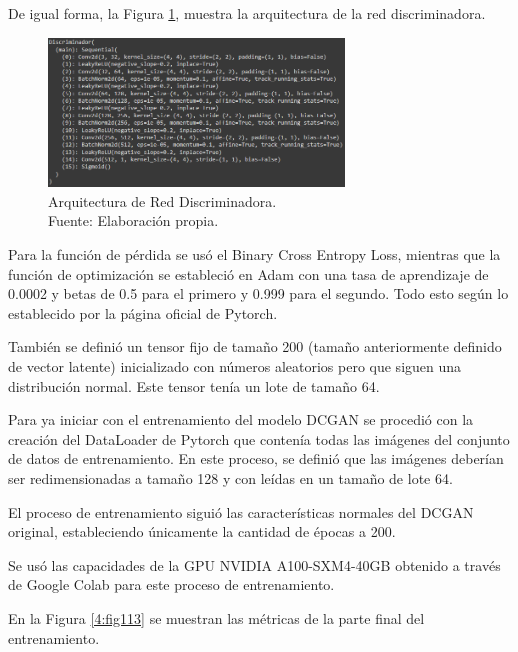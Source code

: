 De igual forma, la Figura \ref{4:fig112}, muestra la arquitectura de la red discriminadora. 

\begin{figure}[H]
	\begin{center}
		\includegraphics[width=0.70\textwidth]{4/figures/discriminator_network.PNG}
		\caption[Arquitectura de Red Discriminadora]{Arquitectura de Red Discriminadora. \\
		Fuente: Elaboración propia.}
		\label{4:fig112}
	\end{center}
\end{figure}

Para la función de pérdida se usó el Binary Cross Entropy Loss, mientras que la función de optimización se estableció en Adam con una tasa de aprendizaje de 0.0002 y betas de 0.5 para el primero y 0.999 para el segundo. Todo esto según lo establecido por la página oficial de Pytorch.

También se definió un tensor fijo de tamaño 200 (tamaño anteriormente definido de vector latente) inicializado con números aleatorios pero que siguen una distribución normal. Este tensor tenía un lote de tamaño 64.

Para ya iniciar con el entrenamiento del modelo DCGAN se procedió con la creación del DataLoader de Pytorch que contenía todas las imágenes del conjunto de datos de entrenamiento. En este proceso, se definió que las imágenes deberían ser redimensionadas a tamaño 128 y con leídas en un tamaño de lote 64.

El proceso de entrenamiento siguió las características normales del DCGAN original, estableciendo únicamente la cantidad de épocas a 200.

Se usó las capacidades de la GPU NVIDIA A100-SXM4-40GB obtenido a través de Google Colab para este proceso de entrenamiento.

En la Figura \ref{4:fig113} se muestran las métricas de la parte final del entrenamiento.

